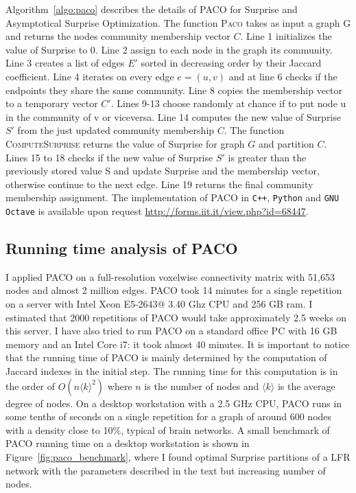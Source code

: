 Algorithm~\ref{algo:paco} describes the details of PACO for Surprise and Asymptotical Surprise Optimization.
The function \textsc{Paco} takes as input a graph G and returns the nodes community membership vector $C$.
Line 1 initializes the value of Surprise to 0.
Line 2 assign to each node in the graph its community.
Line 3 creates a list of edges $E'$ sorted in decreasing order by their Jaccard coefficient.
Line 4 iterates on every edge $e=(u,v)$ and at line 6 checks if the endpoints they share the same community.
Line 8 copies the membership vector to a temporary vector $C'$.
Lines 9-13 choose randomly at chance if to put node u in the community of v or viceversa.
Line 14 computes the new value of Surprise $S'$ from the just updated community membership $C$.
The function \textsc{ComputeSurprise} returns the value of Surprise for graph $G$ and partition $C$.
Lines 15 to 18 checks if the new value of Surprise $S'$ is greater than the previously stored value S and update Surprise and the membership vector, otherwise continue to the next edge.
Line 19 returns the final community membership assignment.
The implementation of PACO in \texttt{C++}, \texttt{Python} and \texttt{GNU Octave} is available upon request \url{http://forms.iit.it/view.php?id=68447}.


\subsection{Running time analysis of PACO}
I applied PACO on a full-resolution voxelwise connectivity matrix with 51,653 nodes and almost 2 million edges.
PACO took 14 minutes for a single repetition on a server with Intel Xeon E5-2643@ 3.40 Ghz CPU and 256 GB ram.
I estimated that 2000 repetitions of PACO would take approximately 2.5 weeks on this server.
I have also tried to run PACO on a standard office PC with 16 GB memory and an Intel Core i7: it took almost 40 minutes.
It is important to notice that the running time of PACO is mainly determined by the computation of Jaccard indexes in the initial step.
The running time for this computation is in the order of $O(n\langle k \rangle^2)$ where $n$ is the number of nodes and $\langle k \rangle$ is the average degree of nodes.
On a desktop workstation with a 2.5 GHz CPU, PACO runs in some tenths of seconds on a single repetition for a graph of around 600 nodes with a density close to 10\%, typical of brain networks.
A small benchmark of PACO running time on a desktop workstation is shown in Figure~\ref{fig:paco_benchmark}, where I found optimal Surprise partitions of a LFR network with the parameters described in the text but increasing number of nodes.

